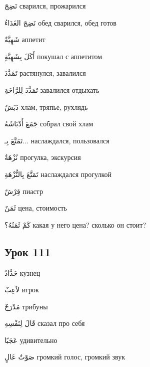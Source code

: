 \documentclass[a5paper]{article}
\newcommand\textstyleDropCaps[1]{#1}
\newcommand\textstyleCaptioncharacters[1]{#1}
\begin{document}
\textstyleCaptioncharacters{نَضِجَ }\textstyleDropCaps{сварился, прожарил­ся‎}

\textstyleCaptioncharacters{نَضِجَ الغَدَاءُ }\textstyleDropCaps{обед сва­рился, обед готов‎}

\textstyleCaptioncharacters{شَهِيَّةٌ }\textstyleDropCaps{аппетит‎}

\textstyleCaptioncharacters{أَكَلَ بِشَهِيَّةٍ }\textstyleDropCaps{покушал с аппетитом‎}

\textstyleCaptioncharacters{تَمَدَّدَ }\textstyleDropCaps{растянулся, зава­лился‎}

\textstyleCaptioncharacters{تَمَدَّدَ لِلرَّاحَةِ }\textstyleDropCaps{завалился отдыхать‎}

\textstyleCaptioncharacters{دَبَشٌ }\textstyleDropCaps{хлам, тряпье, рух­лядь‎}

\textstyleCaptioncharacters{جَمَعَ أَدْبَاشَهُ }\textstyleDropCaps{собрал свой хлам‎}

\textstyleCaptioncharacters{تَمَتَّعَ بِـ... }\textstyleDropCaps{наслаждался, пользовался‎}

\textstyleCaptioncharacters{نُزْهَةٌ }\textstyleDropCaps{прогулка, экскурсия‎}

\textstyleCaptioncharacters{تَمَتَّعَ بِالنُّزْهَةِ }\textstyleDropCaps{насла­ждался прогулкой ‎}

\textstyleCaptioncharacters{قِرْشٌ }\textstyleDropCaps{пиастр‎}

\textstyleCaptioncharacters{ثَمَنٌ }\textstyleDropCaps{цена, стоимость‎}

\textstyleCaptioncharacters{كَمْ ثَمَنُهُ؟ }\textstyleDropCaps{какая у него цена? сколько он стоит?‎}

\subsection[Урок 111‎]{\textstyleDropCaps{Урок 111‎}}
\textstyleCaptioncharacters{حَدَّادٌ }\textstyleDropCaps{кузнец‎}

\textstyleCaptioncharacters{لاَعِبٌ }\textstyleDropCaps{игрок‎}

\textstyleCaptioncharacters{مَدْرَجٌ }\textstyleDropCaps{трибуны‎}

\textstyleCaptioncharacters{قَالَ لِنَفْسِهِ }\textstyleDropCaps{сказал про себя‎}

\textstyleCaptioncharacters{عَجَبًا }\textstyleDropCaps{удивительно‎}

\textstyleCaptioncharacters{صَوْتٌ عَالٍ }\textstyleDropCaps{громкий го­лос, громкий звук‎}
\end{document}
